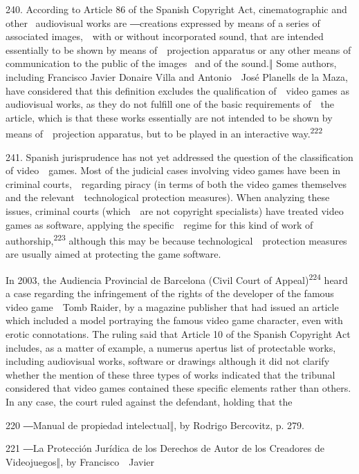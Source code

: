 \documentclass[
]{article}
\begin{document}
{240. }{According to Article 86 of the Spanish }{Copyright Act}{,
cinematographic and other }{~audiovisual works are ―}{creations
expressed by means of a series of associated images,~~with or without
incorporated sound, that are intended essentially to be shown by means
of~~projection apparatus or any other means of communication to the
public of the images }{~and of the sound.‖ }{Some authors, including
Francisco Javier Donaire Villa and Antonio~~José Planells de la Maza,
have considered that this definition excludes the qualification
of~~video games as audiovisual works, as they do not fulfill one of the
basic requirements of~~the article, which is that these works
essentially are not intended to be shown by means of~~projection
apparatus, but to be played in an interactive
way.}\textsuperscript{{222}}

{241. }{Spanish jurisprudence has not yet addressed the question of the
classification of video~~games. Most of the judicial cases involving
video games have been in criminal courts,~~regarding piracy (in terms of
both the video games themselves and the relevant~~technological
protection measures). When analyzing these issues, criminal courts
(which~~are not copyright specialists) have treated video games as
software, applying the specific~~regime for this kind of work of
authorship,}\textsuperscript{{223 }}{although this may be because
technological~~protection measures are usually aimed at protecting the
game software.}

{In 2003, the }{Audiencia Provincial de Barcelona }{(Civil Court of
Appeal)}\textsuperscript{{224 }}{heard a case regarding the infringement
of the rights of the developer of the famous video game~~}{Tomb
Raider}{, by a magazine publisher that had issued an article which
included a model portraying the famous video game character, even with
erotic connotations. The ruling said that Article 10 of the Spanish
}{Copyright Act }{includes, as a matter of example, a }{numerus apertus
}{list of protectable works, including audiovisual works, software or
drawings although it did not clarify whether the mention of these three
types of works indicated that the tribunal considered that video games
contained these specific elements rather than others. In any case, the
court ruled against the defendant, holding that the}

{220 }{―Manual de propiedad intelectual‖, }{by Rodrigo Bercovitz, p.
279.}

{221 }{―}{La Protección Jurídica de los Derechos de Autor de los
Creadores de Videojuegos}{‖, by Francisco~~Javier}
\end{document}
